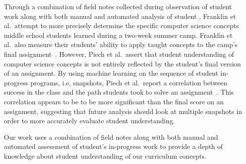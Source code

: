 Through a combination of field notes collected during observation of student
work along with both manual and automated analysis of student ,
Franklin et al.\ attempt to more precisely determine the specific computer
science concepts middle school students learned during a two-week summer
camp. Franklin et al.\ also measure their students' ability to apply taught
concepts to the camp's final assignment~\cite{Boe:2013:HLS:2445196.2445265,
  Franklin:2013:SBO}. However, Piech et al.\ assert that student understanding
of computer science concepts is not entirely reflected by the student's final
version of an assignment. By using machine learning on the sequence of student
in-progress programs, i.e, snapshots, Piech et al.\ report a correlation
between success in the class and the path students took to solve an
assignment~\cite{Piech:2012:MSL:2157136.2157182}. This correlation appears to
be to be more significant than the final score on an assignment, suggesting
that future analysis should look at multiple snapshots in order to more
accurately evaluate student understanding.

Our work uses a combination of field notes along with both manual and automated
assessment of student's in-progress work to provide a depth of knowledge about
student understanding of our curriculum concepts.
